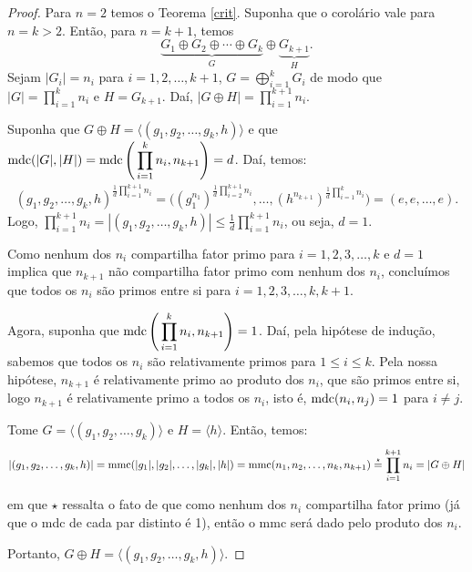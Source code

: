 	\begin{proof}
		Para $n = 2$ temos o Teorema \ref{crit}. Suponha que o corolário
		vale para $n = k>2$. Então, para $n = k+1$, temos
		\begin{equation*}
		    \underbrace{G_1\oplus G_2\oplus\cdots\oplus G_k}_{G}\oplus\underbrace{ G_{k+1}}_{H}. 
		\end{equation*}
		Sejam $|G_i| = n_i$ para 
		$i = 1, 2, \dots , k + 1$, $\displaystyle{G = \bigoplus_{i=1}^{k}G_i}$
		de modo que $\displaystyle{|G| = \prod_{i =1}^{k}n_i}$ e 
		$H = G_{k+1}$. Daí, 
		$\displaystyle{|G\oplus H| = \prod_{i = 1}^{k+1}n_i}$.
		\par\vspace{0.3cm} Suponha que 
		$G\oplus H = \langle (g_1, g_2, \dots , g_k, h) \rangle$ e que
		$\displaystyle{\operatorname{mdc}(|G|,|H|)=\operatorname{mdc}\Bigg(\prod_{i=1}^{k}n_i,n_{k+1}\Bigg)=d}$. Daí, temos:
		\begin{align*}
		    (g_1, g_2, \dots, g_k, h)^{\displaystyle{\frac{1}{d}\prod_{i=1}^{k+1}n_i}} 
		    = \Bigg((g_1^{n_1})^{\displaystyle{\frac{1}{d}\prod_{i=2}^{k+1}n_i}},\dots,(h^{n_{k+1}})^{\displaystyle{\frac{1}{d}\prod_{i = 1}^{k}n_i}} \Bigg) 
		    = (e, e, \dots, e).
		\end{align*}
		Logo, $\displaystyle{\prod_{i=1}^{k+1}n_i=|(g_1, g_2,\dots, g_k, h)|
		\leq\frac{1}{d}\prod_{i=1}^{k+1}n_i}$, ou seja, $d = 1$.
		\par\vspace{0.3cm} Como nenhum dos $n_i$ compartilha fator primo
		para $i = 1, 2, 3, \dots, k$ e $d = 1$ implica que $n_{k+1}$ não
		compartilha fator primo com nenhum dos $n_i$, concluímos que todos 
		os $n_i$ são primos entre si para $i = 1, 2, 3, \dots, k, k+1$.
		\par\vspace{0.3cm} Agora, suponha que
		$\displaystyle{\operatorname{mdc}\Bigg(\prod_{i=1}^{k}n_i , n_{k+1}\Bigg)} = 1$.
		Daí, pela hipótese de indução, sabemos que todos os $n_i$ são
		relativamente primos para $1\leq i\leq k$. Pela nossa hipótese,
		$n_{k+1}$ é relativamente primo ao produto dos $n_i$, que são primos
		entre si, logo $n_{k+1}$ é relativamente primo a todos os $n_i$, 
		isto é, $\operatorname{mdc}(n_i, n_j) = 1$ para $i\neq j$.
		\par\vspace{0.3cm} Tome $G = \langle (g_1, g_2, \dots, g_k) \rangle$ 
		e $H = \langle h \rangle$. Então, temos:
		\begin{align*}
		    |(g_1, g_2, \dots, g_k, h)| 
		    = \operatorname{mmc}(|g_1|, |g_2|, \dots, |g_k|, |h|) 
		    = \operatorname{mmc}(n_1, n_2, \dots, n_k, n_{k+1}) 
		    \overset{\star}{=} \prod_{i=1}^{k+1}n_i = |G\oplus H|
		\end{align*} 
		\par\vspace{0.3cm} em que $\star$ ressalta o fato de que como nenhum
		dos $n_i$ compartilha fator primo (já que o mdc de cada par distinto 
		é 1), então o mmc será dado pelo produto dos $n_i$.
		\par\vspace{0.3cm} Portanto, 
		$G\oplus H = \langle (g_1, g_2, \dots, g_k, h) \rangle$.
	\end{proof}
